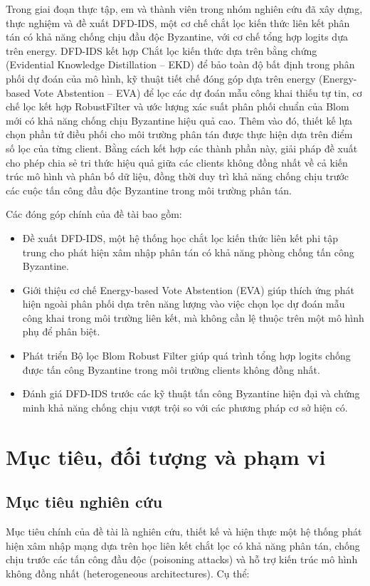 Trong giai đoạn thực tập, em và thành viên trong nhóm nghiên cứu đã xây dựng, thực nghiệm và đề xuất DFD-IDS, một cơ chế chắt lọc kiến thức liên kết phân tán có khả năng chống chịu đầu độc Byzantine, với cơ chế tổng hợp logits dựa trên energy. DFD-IDS kết hợp Chắt lọc kiến thức dựa trên bằng chứng (Evidential Knowledge Distillation -- EKD) để bảo toàn độ bất định trong phân phối dự đoán của mô hình, kỹ thuật tiết chế đóng góp dựa trên energy (Energy-based Vote Abstention -- EVA) để lọc các dự đoán mẫu công khai thiếu tự tin, cơ chế lọc kết hợp RobustFilter \cite{diakonikolas2017robustfilter} và ước lượng xác suất phân phối chuẩn của Blom \cite{blom} mới có khả năng chống chịu Byzantine hiệu quả cao. Thêm vào đó, thiết kế lựa chọn phần tử điều phối cho môi trường phân tán được thực hiện dựa trên điểm số lọc của từng client. Bằng cách kết hợp các thành phần này, giải pháp đề xuất cho phép chia sẻ tri thức hiệu quả giữa các clients không đồng nhất về cả kiến trúc mô hình và phân bố dữ liệu, đồng thời duy trì khả năng chống chịu trước các cuộc tấn công đầu độc Byzantine trong môi trường phân tán.

Các đóng góp chính của đề tài bao gồm:
\begin{itemize}
    \item Đề xuất DFD-IDS, một hệ thống học chắt lọc kiến thức liên kết phi tập trung cho phát hiện xâm nhập phân tán có khả năng phòng chống tấn công Byzantine.
    \item Giới thiệu cơ chế Energy-based Vote Abstention (EVA) giúp thích ứng phát hiện ngoài phân phối dựa trên năng lượng vào việc chọn lọc dự đoán mẫu công khai trong môi trường liên kết, mà không cần lệ thuộc trên một mô hình phụ để phân biệt.
    \item Phát triển Bộ lọc Blom Robust Filter giúp quá trình tổng hợp logits chống được tấn công Byzantine trong môi trường clients không đồng nhất.
    \item Đánh giá DFD-IDS trước các kỹ thuật tấn công Byzantine hiện đại và chứng minh khả năng chống chịu vượt trội so với các phương pháp cơ sở hiện có.
\end{itemize}

\section{Mục tiêu, đối tượng và phạm vi}
\label{sec:objectives}

\subsection{Mục tiêu nghiên cứu}
Mục tiêu chính của đề tài là nghiên cứu, thiết kế và hiện thực một hệ thống phát hiện xâm nhập mạng dựa trên học liên kết chắt lọc có khả năng phân tán, chống chịu trước các tấn công đầu độc (poisoning attacks) và hỗ trợ kiến trúc mô hình không đồng nhất (heterogeneous architectures). Cụ thể:

